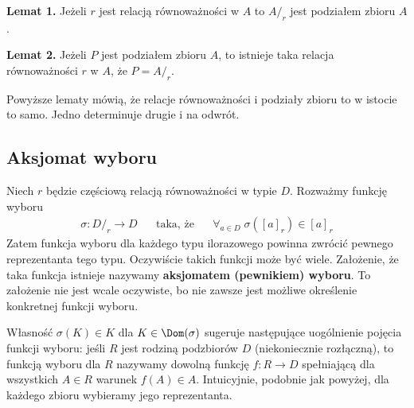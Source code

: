 \textbf{Lemat 1.} Jeżeli $r$ jest relacją równoważności w $A$ to $A /_r$ jest podziałem zbioru $A$.

\textbf{Lemat 2.} Jeżeli $P$ jest podziałem zbioru $A$, to istnieje taka relacja równoważności $r$ w $A$, że $P = A /_r$.

Powyższe lematy mówią, że relacje równoważności i podziały zbioru to w istocie to samo. Jedno determinuje drugie i na odwrót.

\subsection{Aksjomat wyboru}
Niech $r$ będzie częściową relacją równoważności w typie $D$. Rozważmy funkcję wyboru
\begin{align*}
    \sigma: D /_r \rightarrow D \hspace{20pt} \text{taka, że} \hspace{20pt} \forall_{a \in D} \; \sigma([a]_r) \in [a]_r
\end{align*}
Zatem funkcja wyboru dla każdego typu ilorazowego powinna zwrócić pewnego reprezentanta tego typu. Oczywiście takich funkcji może być wiele. Założenie, że taka funkcja istnieje nazywamy \textbf{aksjomatem (pewnikiem) wyboru}. To założenie nie jest wcale oczywiste, bo nie zawsze jest możliwe określenie konkretnej funkcji wyboru.

Własność $\sigma(K) \in K$ dla $K \in \Dom(\sigma)$ sugeruje następujące uogólnienie pojęcia funkcji wyboru: jeśli $R$ jest rodziną podzbiorów $D$ (niekoniecznie rozłączną), to funkcją wyboru
dla $R$ nazywamy dowolną funkcję $f: R \rightarrow D$ spełniającą dla wszystkich $A \in R$ warunek $f(A) \in A$. Intuicyjnie, podobnie jak powyżej, dla każdego zbioru wybieramy jego reprezentanta.

